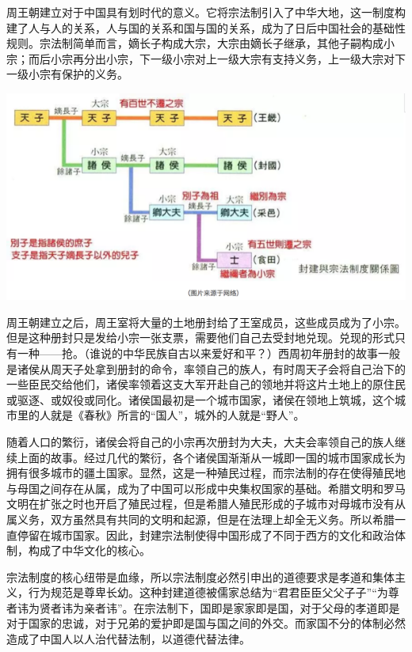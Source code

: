 \documentclass[]{book}
\begin{document}
周王朝建立对于中国具有划时代的意义。它将宗法制引入了中华大地，这一制度构建了人与人的关系，人与国的关系和国与国的关系，成为了日后中国社会的基础性规则。宗法制简单而言，嫡长子构成大宗，大宗由嫡长子继承，其他子嗣构成小宗；而后小宗再分出小宗，下一级小宗对上一级大宗有支持义务，上一级大宗对下一级小宗有保护的义务。

\includegraphics[width=8.33in]{images/gx2}

周王朝建立之后，周王室将大量的土地册封给了王室成员，这些成员成为了小宗。但是这种册封只是发给小宗一张支票，需要他们自己去受封地兑现。兑现的形式只有一种------抢。（谁说的中华民族自古以来爱好和平？）西周初年册封的故事一般是诸侯从周天子处拿到册封的命令，率领自己的族人，有时周天子会将自己治下的一些臣民交给他们，诸侯率领着这支大军开赴自己的领地并将这片土地上的原住民或驱逐、或奴役或同化。诸侯国最初是一个城市国家，诸侯在领地上筑城，这个城市里的人就是《春秋》所言的``国人''，城外的人就是``野人''。

随着人口的繁衍，诸侯会将自己的小宗再次册封为大夫，大夫会率领自己的族人继续上面的故事。经过几代的繁衍，各个诸侯国渐渐从一城即一国的城市国家成长为拥有很多城市的疆土国家。显然，这是一种殖民过程，而宗法制的存在使得殖民地与母国之间存在从属，成为了中国可以形成中央集权国家的基础。希腊文明和罗马文明在扩张之时也开启了殖民过程，但是希腊人殖民形成的子城市对母城市没有从属义务，双方虽然具有共同的文明和起源，但是在法理上却全无义务。所以希腊一直停留在城市国家。因此，封建宗法制使得中国形成了不同于西方的文化和政治体制，构成了中华文化的核心。

宗法制度的核心纽带是血缘，所以宗法制度必然引申出的道德要求是孝道和集体主义，行为规范是尊卑长幼。这种封建道德被儒家总结为``君君臣臣父父子子''``为尊者讳为贤者讳为亲者讳''。在宗法制下，国即是家家即是国，对于父母的孝道即是对于国家的忠诚，对于兄弟的爱护即是国与国之间的外交。而家国不分的体制必然造成了中国人以人治代替法制，以道德代替法律。
\end{document}
